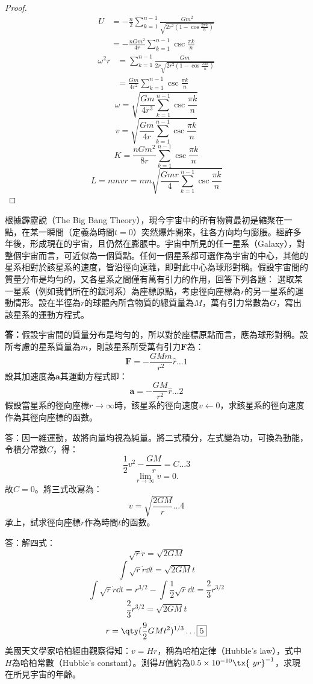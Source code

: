 \documentclass[a4paper,12pt]{article}
\begin{document}
\begin{proof}
\[\begin{aligned}
U&=-\frac{n}{2}\sum_{k=1}^{n-1}\frac{Gm^2}{\sqrt{2r^2\left(1-\cos\frac{2\pi k}{n}\right)}}\\
&=-\frac{nGm^2}{4r}\sum_{k=1}^{n-1}\csc\frac{\pi k}{n}
\end{aligned}\]
\[\begin{aligned}
\omega^2r&=\sum_{k=1}^{n-1}\frac{Gm}{2r\sqrt{2r^2\left(1-\cos\frac{2\pi k}{n}\right)}}\\
&=\frac{Gm}{4r^2}\sum_{k=1}^{n-1}\csc\frac{\pi k}{n}
\end{aligned}\]
\[\omega=\sqrt{\frac{Gm}{4r^3}\sum_{k=1}^{n-1}\csc\frac{\pi k}{n}}\]
\[v=\sqrt{\frac{Gm}{4r}\sum_{k=1}^{n-1}\csc\frac{\pi k}{n}}\]
\[K=\frac{nGm^2}{8r}\sum_{k=1}^{n-1}\csc\frac{\pi k}{n}\]
\[L=nmvr=nm\sqrt{\frac{Gmr}{4}\sum_{k=1}^{n-1}\csc\frac{\pi k}{n}}\]
\end{proof}
根據霹靂說（The Big Bang Theory），現今宇宙中的所有物質最初是縮聚在一點，在某一瞬間（定義為時間$t=0$）突然爆炸開來，往各方向均勻膨脹。經許多年後，形成現在的宇宙，且仍然在膨脹中。宇宙中所見的任一星系（Galaxy），對整個宇宙而言，可近似為一個質點。任何一個星系都可選作為宇宙的中心，其他的星系相對於該星系的速度，皆沿徑向遠離，即對此中心為球形對稱。假設宇宙間的質量分布是均勻的，又各星系之間僅有萬有引力的作用，回答下列各題：
選取某一星系（例如我們所在的銀河系）為座標原點，考慮徑向座標為$r$的另一星系的運動情形。設在半徑為$r$的球體內所含物質的總質量為$M$，萬有引力常數為$G$，寫出該星系的運動方程式。 

\textbf{答：}假設宇宙間的質量分布是均勻的，所以對於座標原點而言，應為球形對稱。設所考慮的星系質量為$m$，則該星系所受萬有引力$\mathbf{F}$為：
\[\mathbf{F}=-\frac{GMm}{r^2}\hat{r}\ldots\boxed{1}\]
設其加速度為$\mathbf{a}$其運動方程式即：
\[\mathbf{a}=-\frac{GM}{r^2}\hat{r}\ldots\boxed{2}\]
假設當星系的徑向座標$r\to\infty$時，該星系的徑向速度$v\leftarrow 0$，求該星系的徑向速度作為其徑向座標的函數。 

答：因一維運動，故將向量均視為純量。將二式積分，左式變為功，可換為動能，令積分常數$C$，得：
\[\frac{1}{2}v^2-\frac{GM}{r}=C\ldots\boxed{3}\]
\[\lim_{r\to\infty}v=0.\]
故$C=0$。將三式改寫為：
\[v=\sqrt{\frac{2GM}{r}}\ldots\boxed{4}\]
承上，試求徑向座標$r$作為時間$t$的函數。 

答：解四式：
\[\sqrt{r}\dot{r}=\sqrt{2GM}\]
\[\int\sqrt{r}\dot{r}\dd{t}=\sqrt{2GM}t\]
\[\int\sqrt{r}\dot{r}\dd{t}=r^{3/2}-\int \frac{1}{2}\sqrt{r}\dd{t}=\frac{2}{3}r^{3/2}\]
\[\frac{2}{3}r^{3/2}=\sqrt{2GM}t\]
\[r=\qty(\frac{9}{2}GMt^2)^{1/3}\ldots\boxed{5}\]
美國天文學家哈柏經由觀察得知：$v=Hr$，稱為哈柏定律（Hubble's law），式中$H$為哈柏常數（Hubble's constant）。測得$H$值約為$0.5\times 10^{-10}\tx{\ yr}^{-1}$，求現在所見宇宙的年齡。 
\end{document}
